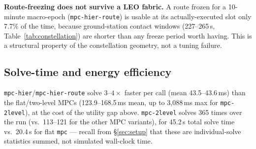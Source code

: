 \textbf{Route-freezing does not survive a LEO fabric.} A route frozen for a
10-minute macro-epoch (\texttt{mpc-hier-route}) is usable at its
actually-executed slot only 7.7\% of the time, because ground-station
contact windows (227--265\,s, Table~\ref{tab:constellation}) are shorter
than any freeze period worth having. This is a structural property of the
constellation geometry, not a tuning failure.

\subsection{Solve-time and energy efficiency}

\texttt{mpc-hier}/\texttt{mpc-hier-route} solve $3$--$4\times$ faster per
call (mean 43.5--43.6\,ms) than the flat/two-level MPCs (123.9--168.5\,ms
mean, up to 3{,}088\,ms max for \texttt{mpc-2level}), at the cost of the
utility gap above. \texttt{mpc-2level} solves 365 times over the run
(vs.\ 113--121 for the other MPC variants), for 45.2\,s total solve time
vs.\ 20.4\,s for flat \texttt{mpc} — recall from \S\ref{sec:setup} that these
are individual-solve statistics summed, not simulated wall-clock time.
